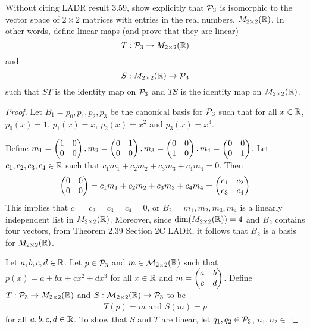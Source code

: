 \begin{question}
\normalfont
\noindent Without citing LADR result 3.59, show explicitly that  $\P_3$ is isomorphic to the vector space of $2\times2$ matrices with entries in the real numbers, $M_{2\times 2}(\real)$. In other words, define linear maps (and prove that they are linear)
\[
T: \P_3 \to M_{2\times2}(\real)
\]
and 
\[
S: M_{2\times2}(\real) \to \P_3
\]
such that $ST$ is the identity map on $\P_3$ and $TS$ is the identity map on $M_{2\times2}(\real)$.  \\ 


\end{question}

\begin{proof}
    \renewcommand{\qedsymbol}{$\blacksquare$}
    Let $B_1=p_0,p_1,p_2,p_3$ be the canonical basis for $\P_3$ such that for all $x\in\R$, $p_0(x)=1$, $p_1(x)=x$, $p_2(x)=x^2$ and $p_3(x)=x^3$.

    Define $m_1=\MatTwoTwo{1}{0}{0}{0},m_2=\MatTwoTwo{0}{1}{0}{0},m_3=\MatTwoTwo{0}{0}{1}{0},m_4=\MatTwoTwo{0}{0}{0}{1}$. Let $c_1,c_2,c_3,c_4\in\R$ such that $c_1m_1+c_2m_2+c_3m_3+c_4m_4=0$. Then 
    \[
        \begin{aligned}
            \MatTwoTwo{0}{0}{0}{0} 
            = c_1m_1+c_2m_2+c_3m_3+c_4m_4
            = \MatTwoTwo{c_1}{c_2}{c_3}{c_4}
        \end{aligned}
    \]
    This implies that $c_1=c_2=c_3=c_4=0$, or $B_2=m_1,m_2,m_3,m_4$ is a linearly independent list in $M_{2\times 2}(\R)$.
    Moreover, since $\dim(M_{2\times 2}(\R))=4$ and $B_2$ contains four vectors, from Theorem 2.39 Section 2C LADR, it follows that $B_2$ is a basis for $M_{2\times 2}(\R)$.
    
    Let $a,b,c,d\in\R$. 
    Let $p\in\P_3$ and $m\in\M_{2\times 2}(\R)$ such that $p(x)=a+bx+cx^2+dx^3$ for all $x\in\R$ and $m=\MatTwoTwo{a}{b}{c}{d}$.
    Define $T:\P_3\to M_{2\times 2}(\R)$ and $S:\M_{2\times 2}(\R)\to\P_3$ to be
    \[
        \begin{aligned}
            T(p)=m \text{ and } S(m)=p
        \end{aligned}
    \]
    for all $a,b,c,d\in\R$.
    To show that $S$ and $T$ are linear, let $q_1,q_2\in\P_3$, $n_1,n_2\in$
\end{proof}